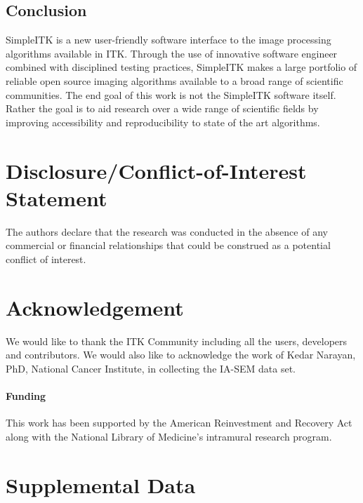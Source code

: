 \documentclass{frontiersMED} %
\begin{document}
\subsection{Conclusion}
SimpleITK is a new user-friendly software interface to the image
processing algorithms available in ITK. Through the use of innovative
software engineer combined with disciplined testing practices,
SimpleITK makes a large portfolio of reliable open source imaging
algorithms available to a broad range of scientific communities. The
end goal of this work is not the SimpleITK software itself. Rather the
goal is to aid research over a wide range of scientific fields by
improving accessibility and reproducibility to state of the art algorithms. 

\section*{Disclosure/Conflict-of-Interest Statement}
The authors declare that the research was conducted in the absence of any commercial or financial relationships that could be construed as a potential conflict of interest.

\section*{Acknowledgement}

We would like to thank the ITK Community including all the users,
developers and contributors. We would also like to acknowledge the
work of Kedar Narayan, PhD, National Cancer Institute,  in collecting
the IA-SEM data set. 
 
\paragraph{Funding\textcolon}

This work has been supported by the American
Reinvestment and Recovery Act along with the National Library of
Medicine's intramural research program.

\section*{Supplemental Data}
\end{document}
